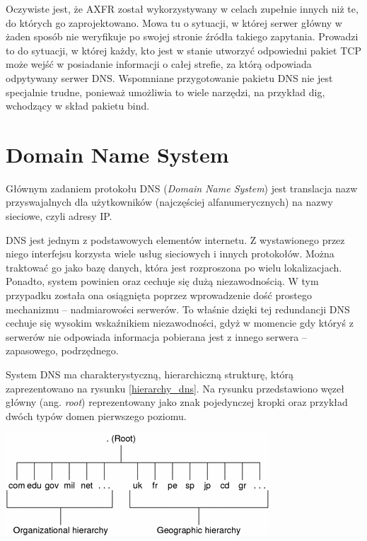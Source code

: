 Oczywiste jest, że AXFR został wykorzystywany w celach zupełnie innych niż te, do których go zaprojektowano. Mowa tu o sytuacji, w której serwer główny w żaden sposób nie weryfikuje po swojej stronie źródła takiego zapytania. Prowadzi to do sytuacji, w której każdy, kto jest w stanie utworzyć odpowiedni pakiet TCP może wejść w posiadanie informacji o całej strefie, za którą odpowiada odpytywany serwer DNS. Wspomniane przygotowanie pakietu DNS nie jest specjalnie trudne, ponieważ umożliwia to wiele narzędzi, na przykład dig, wchodzący w skład pakietu bind.

\section{Domain Name System}
Głównym zadaniem protokołu DNS (\textit{Domain Name System}) jest translacja nazw przyswajalnych dla użytkowników (najczęściej alfanumerycznych) na nazwy sieciowe, czyli adresy IP.

DNS jest jednym z podstawowych elementów internetu. Z wystawionego przez niego interfejsu korzysta wiele usług sieciowych i innych protokołów. Można traktować go jako bazę danych, która jest rozproszona po wielu lokalizacjach. Ponadto, system powinien oraz cechuje się dużą niezawodnością. W tym przypadku została ona osiągnięta poprzez wprowadzenie dość prostego mechanizmu -- nadmiarowości serwerów. To właśnie dzięki tej redundancji DNS cechuje się wysokim wskaźnikiem niezawodności, gdyż w momencie gdy któryś z serwerów nie odpowiada informacja pobierana jest z innego serwera -- zapasowego, podrzędnego.

System DNS ma charakterystyczną, hierarchiczną strukturę, którą zaprezentowano na rysunku \ref{hierarchy_dns}. Na rysunku przedstawiono węzeł główny (ang. \textit{root}) reprezentowany jako znak pojedynczej kropki oraz przykład dwóch typów domen pierwszego poziomu.

\begin{center}
	\includegraphics[scale=1]{image/hierarchy_dns}
	\label{hierarchy_dns}
\end{center}


